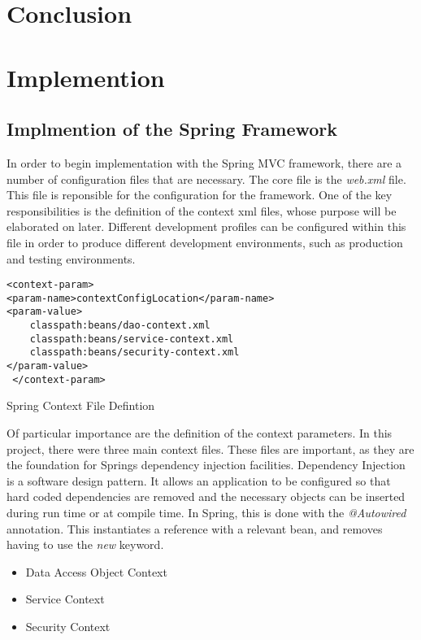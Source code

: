 \section{Conclusion}

\section{Implemention}
\subsection{Implmention of the Spring Framework}
In order to begin implementation with the Spring MVC framework, there are a number of configuration files that are necessary. The core file is the \textit{web.xml} file. This file is reponsible for the configuration for the framework. One of the key responsibilities is the definition of the context xml files, whose purpose will be elaborated on later. Different development profiles can be configured within this file in order to produce different development environments, such as production and testing environments.\newline 

\begin{table}[H]
\begin{lstlisting}
<context-param>
<param-name>contextConfigLocation</param-name>
<param-value>
	classpath:beans/dao-context.xml
	classpath:beans/service-context.xml
	classpath:beans/security-context.xml
</param-value>
 </context-param>
\end{lstlisting}
\caption{Spring Context File Defintion}
\end{table}

Of particular importance are the definition of the context parameters. In this project, there were three main context files. These files are important, as they are the foundation for Springs dependency injection facilities. Dependency Injection is a software design pattern. It allows an application to be configured so that hard coded dependencies are removed and the necessary objects can be inserted during run time or at compile time. In Spring, this is done with the \textit{@Autowired} annotation. This instantiates a reference with a relevant bean, and removes having to use the \textit{new} keyword. \newline

\begin{itemize}
\item Data Access Object Context
\item Service Context
\item Security Context
\end{itemize}

